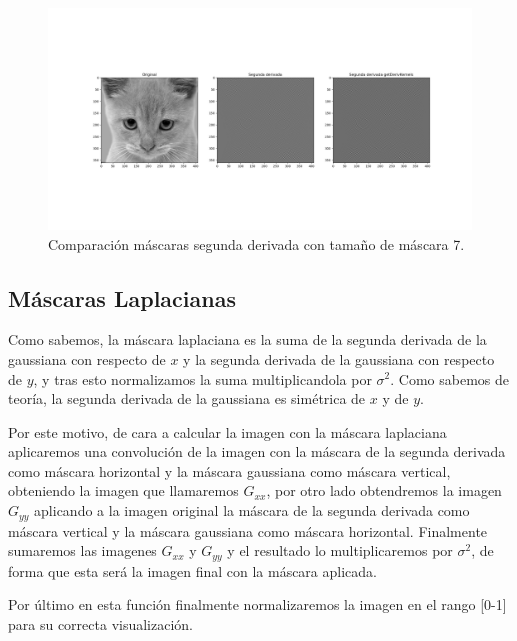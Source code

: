 \documentclass[12pt, spanish]{article}
\begin{document}
\begin{figure}[H]
  \centering
      \includegraphics[width=\textwidth]{1d-2s7.png}
 		 \caption{Comparación máscaras segunda derivada con tamaño de máscara 7.}
  		\label{fig:ej1d}

\end{figure}

\subsection{Máscaras Laplacianas}

Como sabemos, la máscara laplaciana es la suma de la segunda derivada de la gaussiana con respecto de $x$ y la segunda derivada de la gaussiana con respecto de $y$, y tras esto normalizamos la suma multiplicandola por $\sigma^2$. Como sabemos de teoría, la segunda derivada de la gaussiana es simétrica de $x$ y de $y$.

Por este motivo, de cara a calcular la imagen con la máscara laplaciana aplicaremos una convolución de la imagen con la máscara de la segunda derivada como máscara horizontal y la máscara gaussiana como máscara vertical, obteniendo la imagen que llamaremos $G_{xx}$, por otro lado obtendremos la imagen $G_{yy}$ aplicando a la imagen original la máscara de la segunda derivada como máscara vertical y la máscara gaussiana como máscara horizontal. Finalmente sumaremos las imagenes $G_{xx}$ y $G_{yy}$ y el resultado lo multiplicaremos por $\sigma^2$, de forma que esta será la imagen final con la máscara aplicada.

Por último en esta función finalmente normalizaremos la imagen en el rango [0-1] para su correcta visualización.
\end{document}
